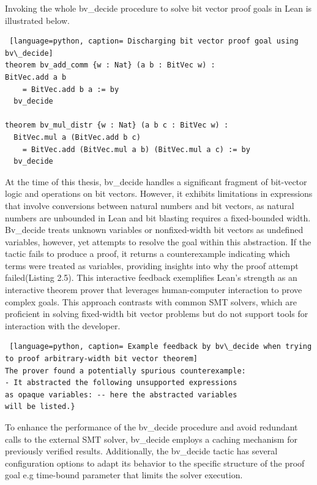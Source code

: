 Invoking the whole bv\_decide procedure to solve bit vector proof goals in Lean is illustrated below.
\begin{lstlisting} [language=python, caption= Discharging bit vector proof goal using bv\_decide]
theorem bv_add_comm {w : Nat} (a b : BitVec w) : 
BitVec.add a b 
    = BitVec.add b a := by
  bv_decide

theorem bv_mul_distr {w : Nat} (a b c : BitVec w) : 
  BitVec.mul a (BitVec.add b c) 
    = BitVec.add (BitVec.mul a b) (BitVec.mul a c) := by
  bv_decide
\end{lstlisting}

At the time of this thesis, bv\_decide handles a significant fragment of bit-vector logic and operations on bit vectors. However, it exhibits limitations in expressions that involve conversions between natural numbers and bit vectors, as natural numbers are unbounded in Lean and bit blasting requires a fixed-bounded width. Bv\_decide treats unknown variables or nonfixed-width bit vectors as undefined variables, however, yet attempts to resolve the goal within this abstraction. If the tactic fails to produce a proof, it returns a counterexample indicating which terms were treated as variables, providing insights into why the proof attempt failed(Listing 2.5). This interactive feedback exemplifies Lean's strength as an interactive theorem prover that leverages human-computer interaction to prove complex goals. This approach contrasts with common SMT solvers, which are proficient in solving fixed-width bit vector problems but do not support tools for interaction with the developer.


\begin{lstlisting} [language=python, caption= Example feedback by bv\_decide when trying to proof arbitrary-width bit vector theorem]
The prover found a potentially spurious counterexample:
- It abstracted the following unsupported expressions
as opaque variables: -- here the abstracted variables
will be listed.}
\end{lstlisting}





To enhance the performance of the bv\_decide procedure and avoid redundant calls to the external SMT solver, bv\_decide employs a caching mechanism for previously verified results. Additionally, the bv\_decide tactic has several configuration options to adapt its behavior to the specific structure of the proof goal e.g time-bound parameter that limits the solver execution. 

